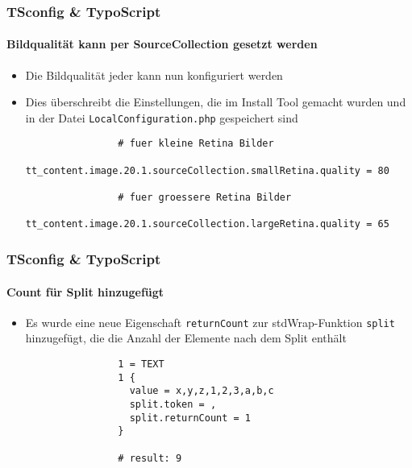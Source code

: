 \begin{frame}[fragile]
	\frametitle{TSconfig \& TypoScript}
	\framesubtitle{Bildqualität kann per SourceCollection gesetzt werden}

	\lstset{basicstyle=\tiny\ttfamily}

	\begin{itemize}

		\item Die Bildqualität jeder  kann nun konfiguriert werden

		\item Dies überschreibt die Einstellungen, die im Install Tool gemacht wurden und
			in der Datei \texttt{LocalConfiguration.php} gespeichert sind

			\begin{lstlisting}
				# fuer kleine Retina Bilder
				tt_content.image.20.1.sourceCollection.smallRetina.quality = 80

				# fuer groessere Retina Bilder
				tt_content.image.20.1.sourceCollection.largeRetina.quality = 65
			\end{lstlisting}
	\end{itemize}

\end{frame}

\begin{frame}[fragile]
	\frametitle{TSconfig \& TypoScript}
	\framesubtitle{Count für Split hinzugefügt}

	\lstset{basicstyle=\tiny\ttfamily}

	\begin{itemize}

		\item Es wurde eine neue Eigenschaft \texttt{returnCount} zur stdWrap-Funktion
			\texttt{split} hinzugefügt, die die Anzahl der Elemente nach dem Split enthält

			\begin{lstlisting}
				1 = TEXT
				1 {
				  value = x,y,z,1,2,3,a,b,c
				  split.token = ,
				  split.returnCount = 1
				}

				# result: 9
			\end{lstlisting}

	\end{itemize}

\end{frame}

